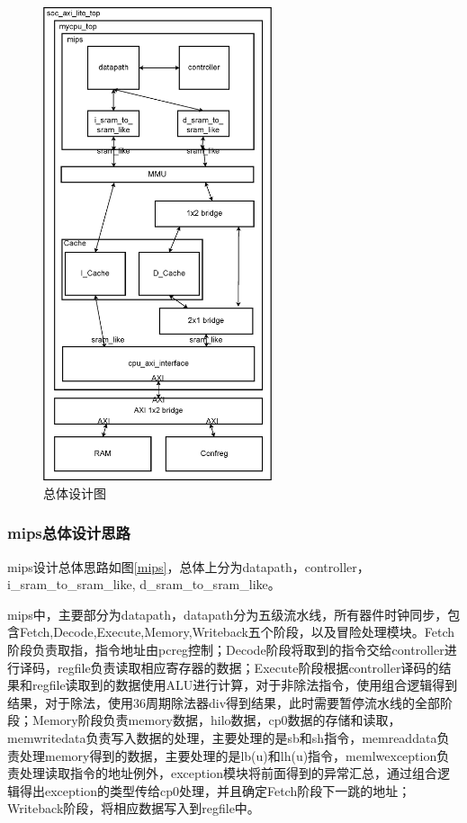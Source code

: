 \begin{figure}[H]
    \centering
    \includegraphics[width=0.6\textwidth]{image/totaldesign.eps}
    \caption{总体设计图}
    \label{figure1}
\end{figure}

\subsubsection{mips总体设计思路}

mips设计总体思路如图\ref{mips}，总体上分为datapath，controller，i\_sram\_to\_sram\_like, d\_sram\_to\_sram\_like。

mips中，主要部分为datapath，datapath分为五级流水线，所有器件时钟同步，包含Fetch,Decode,Execute,Memory,Writeback五个阶段，以及冒险处理模块。Fetch阶段负责取指，指令地址由pcreg控制；Decode阶段将取到的指令交给controller进行译码，regfile负责读取相应寄存器的数据；Execute阶段根据controller译码的结果和regfile读取到的数据使用ALU进行计算，对于非除法指令，使用组合逻辑得到结果，对于除法，使用36周期除法器div得到结果，此时需要暂停流水线的全部阶段；Memory阶段负责memory数据，hilo数据，cp0数据的存储和读取，memwritedata负责写入数据的处理，主要处理的是sb和sh指令，memreaddata负责处理memory得到的数据，主要处理的是lb(u)和lh(u)指令，memlwexception负责处理读取指令的地址例外，exception模块将前面得到的异常汇总，通过组合逻辑得出exception的类型传给cp0处理，并且确定Fetch阶段下一跳的地址；Writeback阶段，将相应数据写入到regfile中。

